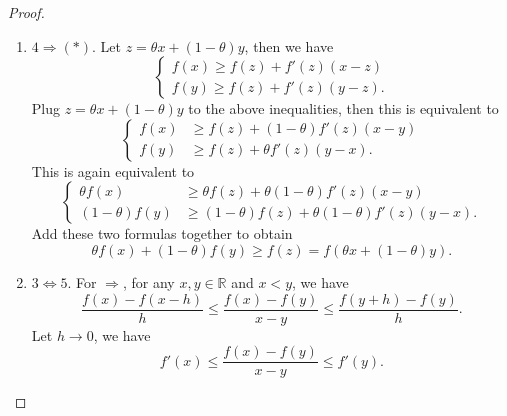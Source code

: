 \documentclass[12pt]{article}
\renewcommand{\(}{\left(}%
\renewcommand{\)}{\right)}%
\renewcommand{\[}{\left[}%
\renewcommand{\]}{\right]}%
\renewcommand{\r}{\mathbb{R}}
\newtheorem{proof}{Proof.}}
\begin{document}
\begin{proof}
\begin{enumerate}
		\begin{equation*}
			\frac{f(x)-f(y)}{x-y}\leq \frac{f(x)-f(z)}{x-z}.
		\end{equation*}
		Let $z\to x-$, we have
		\begin{equation*}
			\begin{split}
				\frac{f(x)-f(y)}{x-y}\leq f'(x)&\Longleftrightarrow f(x)\leq f(y)+f'(x)(x-y)\\
				&\Longleftrightarrow f(y)\geq f(x)+f'(x)(y-x).
			\end{split}
		\end{equation*}
		\item $4\Rightarrow (*)$. Let $z=\theta x+(1-\theta)y$, then we have
		\begin{equation*}
			\left\{
			\begin{split}
				f(x)\geq f(z)+f'(z)(x-z)\\
				f(y)\geq f(z)+f'(z)(y-z).
			\end{split}\right.
		\end{equation*}
		Plug $z=\theta x+(1-\theta)y$ to the above inequalities, then this is equivalent to 
		\begin{equation*}
			\left\{
			\begin{split}
				f(x)&\geq f(z)+(1-\theta)f'(z)(x-y)\\
				f(y)&\geq f(z)+\theta f'(z)(y-x).
			\end{split}\right.
		\end{equation*}
		This is again equivalent to
		\begin{equation*}
			\left\{
			\begin{split}
				\theta f(x)&\geq \theta f(z)+\theta(1-\theta)f'(z)(x-y)\\
				(1-\theta)f(y)&\geq (1-\theta)f(z)+\theta(1-\theta) f'(z)(y-x).
			\end{split}\right.
		\end{equation*}
		Add these two formulas together to obtain
		\begin{equation*}
			\theta f(x)+(1-\theta)f(y)\geq f(z)=f(\theta x+(1-\theta)y).
		\end{equation*}
		\item $3\Leftrightarrow 5$. For $\Rightarrow$, for any $x,y\in\r$ and $x<y$, we have
		\begin{equation*}
			\frac{f(x)-f(x-h)}{h}\leq \frac{f(x)-f(y)}{x-y}\leq \frac{f(y+h)-f(y)}{h}.
		\end{equation*}
		Let $h\to0$, we have 
		\begin{equation*}
			f'(x)\leq \frac{f(x)-f(y)}{x-y}\leq f'(y).

\end{equation*}
\end{enumerate}
\end{proof}
\end{document}
